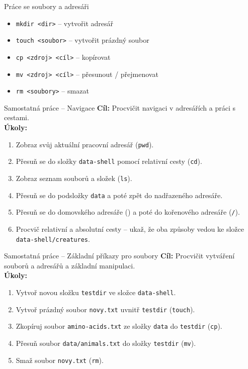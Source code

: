 \documentclass{beamer}
\newcommand{\ts}{\raisebox{-0.25em}{\textasciitilde}}
\begin{document}
  \begin{frame}{Práce se soubory a adresáři}
    \begin{itemize}
      \item \texttt{mkdir <dir>} – vytvořit adresář
      \item \texttt{touch <soubor>} – vytvořit prázdný soubor
      \item \texttt{cp <zdroj> <cíl>} – kopírovat
      \item \texttt{mv <zdroj> <cíl>} – přesunout / přejmenovat
      \item \texttt{rm <soubory>} – smazat
    \end{itemize}
  \end{frame}

\begin{frame}{Samostatná práce – Navigace}
\small
\textbf{Cíl:} Procvičit navigaci v adresářích a práci s cestami.\\[0.5em]

\textbf{Úkoly:}
\begin{enumerate}
  \item Zobraz svůj aktuální pracovní adresář (\texttt{pwd}).
  \item Přesuň se do složky \texttt{data-shell} pomocí relativní cesty (\texttt{cd}).
  \item Zobraz seznam souborů a složek (\texttt{ls}).
  \item Přesuň se do podsložky \texttt{data} a poté zpět do nadřazeného adresáře.
  \item Přesuň se do domovského adresáře (\texttt{\ts}) a poté do kořenového adresáře (\texttt{/}).
  \item Procvič relativní a absolutní cesty – ukaž, že oba způsoby vedou ke složce \texttt{data-shell/creatures}.
\end{enumerate}
\end{frame}

\begin{frame}{Samostatná práce – Základní příkazy pro soubory}
\small
\textbf{Cíl:} Procvičit vytváření souborů a adresářů a základní manipulaci.\\[0.5em]

\textbf{Úkoly:}
\begin{enumerate}
  \item Vytvoř novou složku \texttt{testdir} ve složce \texttt{data-shell}.
  \item Vytvoř prázdný soubor \texttt{novy.txt} uvnitř \texttt{testdir} (\texttt{touch}).
  \item Zkopíruj soubor \texttt{amino-acids.txt} ze složky \texttt{data} do \texttt{testdir} (\texttt{cp}).
  \item Přesuň soubor \texttt{data/animals.txt} do složky \texttt{testdir} (\texttt{mv}).
  \item Smaž soubor \texttt{novy.txt} (\texttt{rm}).
\end{enumerate}
\end{frame}
\end{document}
